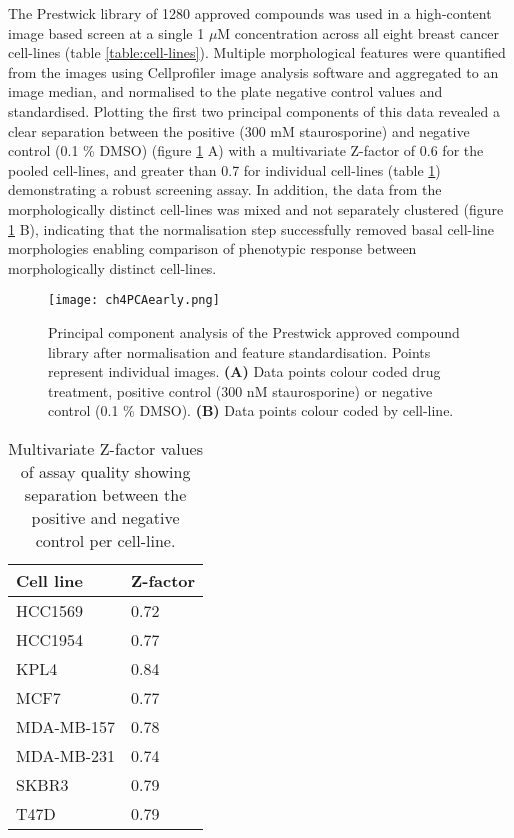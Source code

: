 \documentclass[a4paper,11pt,twoside,openright]{scrbook}
\begin{document}
The Prestwick library of 1280 approved compounds was used in a high-content image based screen at a single 1 $\mu$M 
concentration across all eight breast cancer cell-lines (table \ref{table:cell-lines}).
Multiple morphological features were quantified from the images using Cellprofiler image analysis software and 
aggregated to an image median, and normalised to the plate negative control values and standardised.
Plotting the first two principal components of this data revealed a clear separation between the positive (300 mM 
staurosporine) and negative control (0.1 \% DMSO) (figure \ref{figure:pca_early} A)
with a multivariate Z-factor\cite{Kummel2010} of 0.6 for the pooled cell-lines, and greater than 0.7 for individual 
cell-lines (table \ref{table:z_factors}) demonstrating a robust screening assay.
In addition, the data from the morphologically distinct cell-lines was mixed and not separately clustered (figure 
\ref{figure:pca_early} B), indicating that the normalisation step successfully removed basal cell-line morphologies 
enabling comparison of phenotypic response between morphologically distinct cell-lines.

\begin{figure}
    \texttt{[image: ch4PCAearly.png]}
    \captionsetup{width=0.8\textwidth}
    \caption[Principal components of the Prestwick approved compound library after normalisation and standardisation.]{
        Principal component analysis of the Prestwick approved compound library after normalisation and feature 
standardisation.
        Points represent individual images.
        \textbf{(A)} Data points colour coded drug treatment, positive control (300 nM staurosporine) or negative 
control (0.1 \% DMSO).
        \textbf{(B)} Data points colour coded by cell-line.
    }
    \label{figure:pca_early}
\end{figure}


\begin{table}[]
    \captionsetup{width=0.8\textwidth}
    \caption[Z-factor values of assay quality for each cell-line] {
        Multivariate Z-factor values of assay quality showing separation between the positive and negative control per 
cell-line.
    }
    \begin{footnotesize}
\begin{tabular}{@{}ll@{}}
    \toprule
    Cell line  & Z-factor \\ \midrule
    HCC1569    & 0.72     \\
    HCC1954    & 0.77     \\
    KPL4       & 0.84     \\
    MCF7       & 0.77     \\
    MDA-MB-157 & 0.78     \\
    MDA-MB-231 & 0.74     \\
    SKBR3      & 0.79     \\
    T47D       & 0.79     \\ \bottomrule
\end{tabular}
\end{footnotesize}
\label{table:z_factors}
\end{table}
\end{document}

